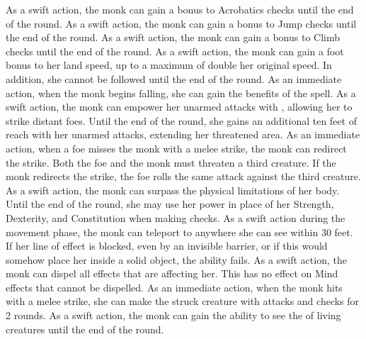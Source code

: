         As a swift action, the monk can gain a  bonus to Acrobatics checks until the end of the round.
        As a swift action, the monk can gain a  bonus to Jump checks until the end of the round.
        As a swift action, the monk can gain a  bonus to Climb checks until the end of the round.
        As a swift action, the monk can gain a  foot bonus to her land speed, up to a maximum of double her original speed.
        In addition, she cannot be followed until the end of the round.
        As an immediate action, when the monk begins falling, she can gain the benefits of the  spell.
        As a swift action, the monk can empower her unarmed attacks with \ki, allowing her to strike distant foes.
        Until the end of the round, she gains an additional ten feet of reach with her unarmed attacks, extending her threatened area.
        As an immediate action, when a foe misses the monk with a melee strike, the monk can redirect the strike.
        Both the foe and the monk must threaten a third creature.
        If the monk redirects the strike, the foe rolls the same attack against the third creature.
        As a swift action, the monk can surpass the physical limitations of her body.
        Until the end of the round, she may use her \ki power in place of her Strength, Dexterity, and Constitution when making checks.
        As a swift action during the movement phase, the monk can teleport to anywhere she can see within 30 feet.
        If her line of effect is blocked, even by an invisible barrier, or if this would somehow place her inside a solid object, the ability fails.
        As a swift action, the monk can dispel all  effects that are affecting her.
        This has no effect on Mind effects that cannot be dispelled.
        As an immediate action, when the monk hits with a melee strike, she can make the struck creature \impaired with attacks and checks for 2 rounds.
        As a swift action, the monk can gain the ability to see the \ki of living creatures until the end of the round.
